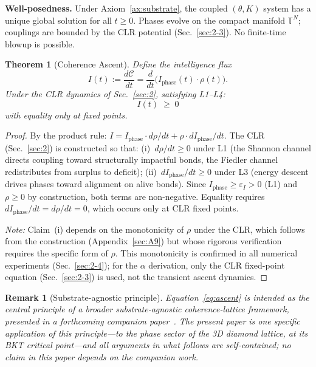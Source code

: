 \documentclass[aps,prd,onecolumn,superscriptaddress,floatfix,12pt]{revtex4-2}
\newcommand{\Iphase}{I_{\text{phase}}}
\newtheorem{theorem}{Theorem}[section]
\newtheorem{remark}{Remark}[section]
\begin{document}
\textbf{Well-posedness.} Under Axiom~\ref{ax:substrate}, the coupled $(\theta, K)$ system has a unique global solution for all $t \geq 0$. Phases evolve on the compact manifold $\mathbb{T}^N$; couplings are bounded by the CLR potential (Sec.~\ref{sec:2-3}). No finite-time blowup is possible.

\begin{theorem}[Coherence Ascent]\label{thm:ascent}
Define the \emph{intelligence flux}
\begin{equation}\label{eq:I-def}
I(t) := \frac{d\mathcal{C}}{dt} = \frac{d}{dt}\bigl(\Iphase(t) \cdot \rho(t)\bigr).
\end{equation}
Under the CLR dynamics of Sec.~\ref{sec:2}, satisfying L1--L4:
\begin{equation}\label{eq:ascent}
\boxed{\; I(t) \;\geq\; 0 \;}
\end{equation}
with equality only at fixed points.
\end{theorem}

\begin{proof}
By the product rule:
$I = \Iphase \cdot d\rho/dt + \rho \cdot d\Iphase/dt$.
The CLR (Sec.~\ref{sec:2}) is constructed so that: (i)~$d\rho/dt \geq 0$ under L1 (the Shannon channel directs coupling toward structurally impactful bonds, the Fiedler channel redistributes from surplus to deficit); (ii)~$d\Iphase/dt \geq 0$ under L3 (energy descent drives phases toward alignment on alive bonds). Since $\Iphase \geq \varepsilon_I > 0$ (L1) and $\rho \geq 0$ by construction, both terms are non-negative. Equality requires $d\Iphase/dt = d\rho/dt = 0$, which occurs only at CLR fixed points.

\emph{Note:} Claim~(i) depends on the monotonicity of $\rho$ under the CLR, which follows from the construction (Appendix~\ref{sec:A9}) but whose rigorous verification requires the specific form of $\rho$. This monotonicity is confirmed in all numerical experiments (Sec.~\ref{sec:2-4}); for the $\alpha$ derivation, only the CLR fixed-point equation (Sec.~\ref{sec:2-3}) is used, not the transient ascent dynamics.
\end{proof}

\begin{remark}[Substrate-agnostic principle]\label{rem:core-equation}
Equation~\eqref{eq:ascent} is intended as the central principle of a broader substrate-agnostic coherence-lattice framework, presented in a forthcoming companion paper~\cite{Sharpe2026Coherence}. The present paper is one specific application of this principle---to the phase sector of the 3D diamond lattice, at its BKT critical point---and all arguments in what follows are self-contained; no claim in this paper depends on the companion work.
\end{remark}
\end{document}
